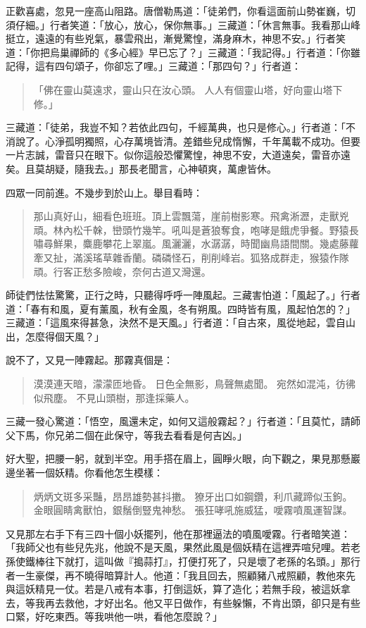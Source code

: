 正歡喜處，忽見一座高山阻路。唐僧勒馬道：「徒弟們，你看這面前山勢崔巍，切須仔細。」行者笑道：「放心，放心，保你無事。」三藏道：「休言無事。我看那山峰挺立，遠遠的有些兇氣，暴雲飛出，漸覺驚惶，滿身麻木，神思不安。」行者笑道：「你把烏巢禪師的《多心經》早已忘了？」三藏道：「我記得。」行者道：「你雖記得，這有四句頌子，你卻忘了哩。」三藏道：「那四句？」行者道：
\begin{quote}
「佛在靈山莫遠求，靈山只在汝心頭。
人人有個靈山塔，好向靈山塔下修。」
\end{quote}

三藏道：「徒弟，我豈不知？若依此四句，千經萬典，也只是修心。」行者道：「不消說了。心淨孤明獨照，心存萬境皆清。差錯些兒成惰懈，千年萬載不成功。但要一片志誠，雷音只在眼下。似你這般恐懼驚惶，神思不安，大道遠矣，雷音亦遠矣。且莫胡疑，隨我去。」那長老聞言，心神頓爽，萬慮皆休。

四眾一同前進。不幾步到於山上。舉目看時：
\begin{quote}
那山真好山，細看色班班。頂上雲飄蕩，崖前樹影寒。飛禽淅瀝，走獸兇頑。林內松千榦，巒頭竹幾竿。吼叫是蒼狼奪食，咆哮是餓虎爭餐。野猿長嘯尋鮮果，麋鹿攀花上翠嵐。風灑灑，水潺潺，時聞幽鳥語間關。幾處藤蘿牽又扯，滿溪瑤草雜香蘭。磷磷怪石，削削峰岩。狐狢成群走，猴猿作隊頑。行客正愁多險峻，奈何古道又灣還。
\end{quote}

師徒們怯怯驚驚，正行之時，只聽得呼呼一陣風起。三藏害怕道：「風起了。」行者道：「春有和風，夏有薰風，秋有金風，冬有朔風。四時皆有風，風起怕怎的？」三藏道：「這風來得甚急，決然不是天風。」行者道：「自古來，風從地起，雲自山出，怎麼得個天風？」

說不了，又見一陣霧起。那霧真個是：
\begin{quote}
漠漠連天暗，濛濛匝地昏。
日色全無影，鳥聲無處聞。
宛然如混沌，彷彿似飛塵。
不見山頭樹，那逢採藥人。
\end{quote}

三藏一發心驚道：「悟空，風還未定，如何又這般霧起？」行者道：「且莫忙，請師父下馬，你兄弟二個在此保守，等我去看看是何吉凶。」

好大聖，把腰一躬，就到半空。用手搭在眉上，圓睜火眼，向下觀之，果見那懸巖邊坐著一個妖精。你看他怎生模樣：
\begin{quote}
炳炳文斑多采豔，昂昂雄勢甚抖擻。
獠牙出口如鋼鑽，利爪藏蹄似玉鉤。
金眼圓睛禽獸怕，銀鬚倒豎鬼神愁。
張狂哮吼施威猛，噯霧噴風運智謀。
\end{quote}

又見那左右手下有三四十個小妖擺列，他在那裡逼法的噴風噯霧。行者暗笑道：「我師父也有些兒先兆，他說不是天風，果然此風是個妖精在這裡弄喧兒哩。若老孫使鐵棒往下就打，這叫做『搗蒜打』，打便打死了，只是壞了老孫的名頭。」那行者一生豪傑，再不曉得暗算計人。他道：「我且回去，照顧豬八戒照顧，教他來先與這妖精見一仗。若是八戒有本事，打倒這妖，算了造化；若無手段，被這妖拿去，等我再去救他，才好出名。他又平日做作，有些躲懶，不肯出頭，卻只是有些口緊，好吃東西。等我哄他一哄，看他怎麼說？」

